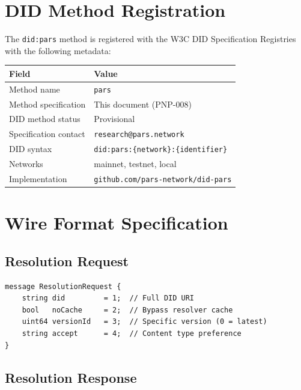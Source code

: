 \documentclass[11pt,a4paper]{article}
\begin{document}
\appendix

\section{DID Method Registration}
\label{app:registration}

The \texttt{did:pars} method is registered with the W3C DID Specification Registries
\cite{w3c-did-core} with the following metadata:

\begin{table}[h]
\centering
\begin{tabular}{ll}
\toprule
\textbf{Field} & \textbf{Value} \\
\midrule
Method name & \texttt{pars} \\
Method specification & This document (PNP-008) \\
DID method status & Provisional \\
Specification contact & \texttt{research@pars.network} \\
DID syntax & \texttt{did:pars:\{network\}:\{identifier\}} \\
Networks & mainnet, testnet, local \\
Implementation & \texttt{github.com/pars-network/did-pars} \\
\bottomrule
\end{tabular}
\end{table}

\section{Wire Format Specification}
\label{app:wire-format}

\subsection{Resolution Request}

\begin{lstlisting}[language={},caption={Resolution request wire format}]
message ResolutionRequest {
    string did         = 1;  // Full DID URI
    bool   noCache     = 2;  // Bypass resolver cache
    uint64 versionId   = 3;  // Specific version (0 = latest)
    string accept      = 4;  // Content type preference
}
\end{lstlisting}

\subsection{Resolution Response}
\end{document}
